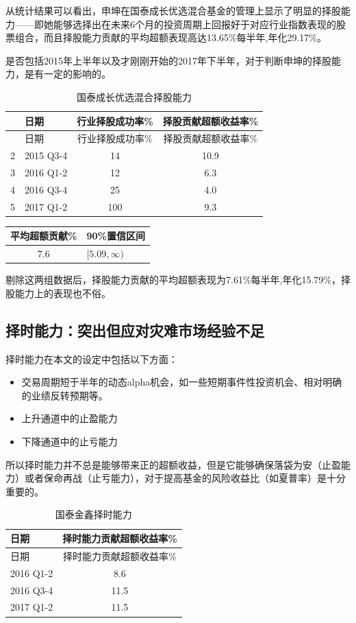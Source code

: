 \documentclass[hyperref,]{ctexart}
\providecommand{\tightlist}{%
  \setlength{\itemsep}{0pt}\setlength{\parskip}{0pt}}
\begin{document}
从统计结果可以看出，申坤在国泰成长优选混合基金的管理上显示了明显的择股能力------即她能够选择出在未来6个月的投资周期上回报好于对应行业指数表现的股票组合，而且择股能力贡献的平均超额表现高达13.65\%每半年,年化29.17\%。

是否包括2015年上半年以及才刚刚开始的2017年下半年，对于判断申坤的择股能力，是有一定的影响的。

\begin{longtable}[]{@{}llcc@{}}
\caption{国泰成长优选混合择股能力}\tabularnewline
\toprule
& 日期 & 行业择股成功率\% & 择股贡献超额收益率\%\tabularnewline
\midrule
\endfirsthead
\toprule
& 日期 & 行业择股成功率\% & 择股贡献超额收益率\%\tabularnewline
\midrule
\endhead
2 & 2015 Q3-4 & 14 & 10.9\tabularnewline
3 & 2016 Q1-2 & 12 & 6.3\tabularnewline
4 & 2016 Q3-4 & 25 & 4.0\tabularnewline
5 & 2017 Q1-2 & 100 & 9.3\tabularnewline
\bottomrule
\end{longtable}

\begin{longtable}[]{@{}cl@{}}
\toprule
平均超额贡献\% & 90\%置信区间\tabularnewline
\midrule
\endhead
7.6 & \([5.09,\infty)\)\tabularnewline
\bottomrule
\end{longtable}

剔除这两组数据后，择股能力贡献的平均超额表现为7.61\%每半年,年化15.79\%，择股能力上的表现也不俗。

\subsection{择时能力：突出但应对灾难市场经验不足}

择时能力在本文的设定中包括以下方面：

\begin{itemize}
\tightlist
\item
  交易周期短于半年的动态alpha机会，如一些短期事件性投资机会、相对明确的业绩反转预期等。
\item
  上升通道中的止盈能力
\item
  下降通道中的止亏能力
\end{itemize}

所以择时能力并不总是能够带来正的超额收益，但是它能够确保落袋为安（止盈能力）或者保命再战（止亏能力），对于提高基金的风险收益比（如夏普率）是十分重要的。

\begin{longtable}[]{@{}lc@{}}
\caption{国泰金鑫择时能力}\tabularnewline
\toprule
日期 & 择时能力贡献超额收益率\%\tabularnewline
\midrule
\endfirsthead
\toprule
日期 & 择时能力贡献超额收益率\%\tabularnewline
\midrule
\endhead
2016 Q1-2 & 8.6\tabularnewline
2016 Q3-4 & 11.5\tabularnewline
2017 Q1-2 & 11.5\tabularnewline
\bottomrule
\end{longtable}
\end{document}
